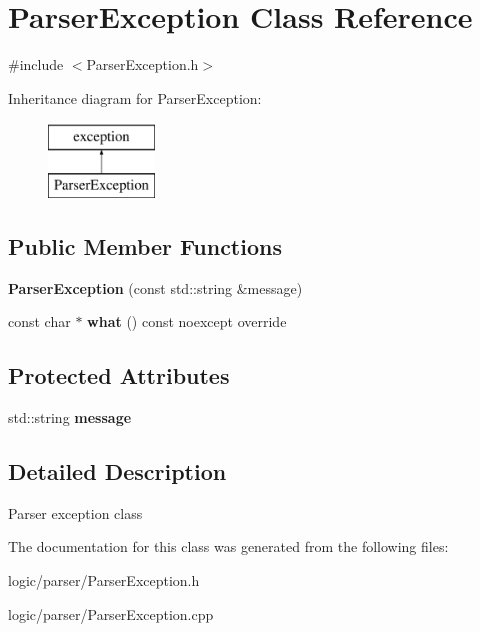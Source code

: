 \hypertarget{classParserException}{}\section{Parser\+Exception Class Reference}
\label{classParserException}


{\ttfamily \#include $<$Parser\+Exception.\+h$>$}

Inheritance diagram for Parser\+Exception\+:\begin{figure}[H]
\begin{center}
\leavevmode
\includegraphics[height=2.000000cm]{classParserException}
\end{center}
\end{figure}
\subsection*{Public Member Functions}
\begin{DoxyCompactItemize}
\item 
\mbox{\label{classParserException_a2fb349add0a7c46a7cd67779230a2ed2}} 
{\bfseries Parser\+Exception} (const std\+::string \&message)
\item 
\mbox{\label{classParserException_a3b07178ab4d1f19888379e618571bf71}} 
const char $\ast$ {\bfseries what} () const noexcept override
\end{DoxyCompactItemize}
\subsection*{Protected Attributes}
\begin{DoxyCompactItemize}
\item 
\mbox{\label{classParserException_a1a45989b6dfdaf8bf4798a74dbeb2b4a}} 
std\+::string {\bfseries message}
\end{DoxyCompactItemize}


\subsection{Detailed Description}
Parser exception class 

The documentation for this class was generated from the following files\+:\begin{DoxyCompactItemize}
\item 
logic/parser/Parser\+Exception.\+h\item 
logic/parser/Parser\+Exception.\+cpp\end{DoxyCompactItemize}
